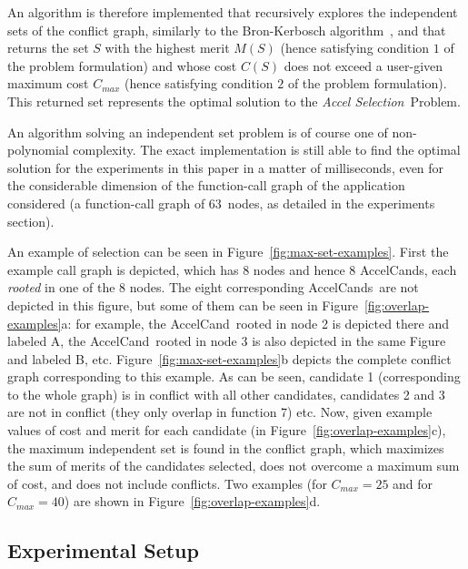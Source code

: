 \documentclass[]{usiinfthesis}
\newcommand{\candidate}{{AccelCand}}
\newcommand{\candidates}{{AccelCand}s}
\newcommand{\asprobname}{\emph{Accel Selection}}
\newcommand{\numberOfcandidates}{{63}}
\begin{document}
An algorithm is therefore implemented that recursively explores the
independent sets of the conflict graph, similarly to the Bron-Kerbosch
algorithm~\cite{BronKerbosch73}, and that returns the set $S$ with the
highest merit $M(S)$ (hence satisfying condition $1$ of the problem
formulation) and whose cost $C(S)$ does not exceed a user-given
maximum cost $C_{max}$ (hence satisfying condition $2$ of the
problem formulation). This returned set represents the optimal
solution to the \asprobname\ Problem.\par

An algorithm solving an independent set problem is of course one of
non-polynomial complexity. The exact implementation is still able to
find the optimal solution for the experiments in this paper in a
matter of milliseconds, even for the considerable dimension of the
function-call graph of the application considered (a function-call
graph of \numberOfcandidates\ nodes, as detailed in the experiments 
section).\par

An example of selection can be seen in
Figure~\ref{fig:max-set-examples}. First the example call graph is
depicted, which has 8 nodes and hence 8 \candidates, each
\emph{rooted} in one of the 8 nodes. The eight corresponding
\candidates\ are not depicted in this figure, but some of them can be
seen in Figure~\ref{fig:overlap-examples}a: for example, the
\candidate\ rooted in node 2 is depicted there and labeled A, the
\candidate\ rooted in node 3 is also depicted in the same Figure and
labeled B, etc.  Figure~\ref{fig:max-set-examples}b depicts the
complete conflict graph corresponding to this example. As can be seen,
candidate 1 (corresponding to the whole graph) is in conflict with all
other candidates, candidates 2 and 3 are not in conflict (they only
overlap in function 7) etc. Now, given example values of cost and
merit for each candidate (in Figure~\ref{fig:overlap-examples}c), the
maximum independent set is found in the conflict graph, which
maximizes the sum of merits of the candidates selected, does not
overcome a maximum sum of cost, and does not include conflicts. Two
examples (for $C_{max} = 25$ and for $C_{max} = 40$) are shown in
Figure~\ref{fig:overlap-examples}d.



\subsection{Experimental Setup}
\label{sec:setup_as}
\end{document}
